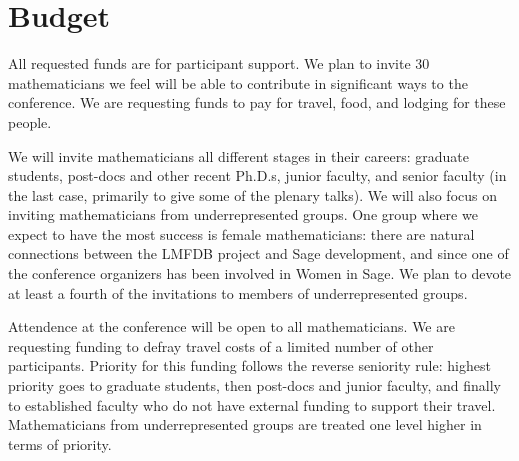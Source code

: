 \documentclass[12pt]{amsart}
\numberwithin{equation}{section}
\begin{document}



\section{Budget}

All requested funds are for participant support.  We plan to invite
$30$ mathematicians we feel will be able to contribute in significant
ways to the conference.  We are requesting funds to pay for travel,
food, and lodging for these people.

We will invite mathematicians all different stages in their careers:
graduate students, post-docs and other recent Ph.D.s, junior faculty,
and senior faculty (in the last case, primarily to give some of the
plenary talks).  We will also focus on inviting mathematicians from
underrepresented groups.  One group where we expect to have the most
success is female mathematicians:  there are natural connections
between the \textsf{LMFDB} project and \textsf{Sage} development, 
and since one of the conference organizers has been 
involved in Women in Sage.  We plan to devote at least a fourth of the
invitations to members of underrepresented groups.

Attendence at the conference will be open to all mathematicians.  We
are requesting funding to defray travel costs of a limited number of
other participants.  Priority for this funding follows the reverse
seniority rule: highest priority goes to graduate students, then
post-docs and junior faculty, and finally to established faculty who
do not have external funding to support their travel.  Mathematicians
from underrepresented groups are treated one level higher in terms of
priority.

\end{document}
